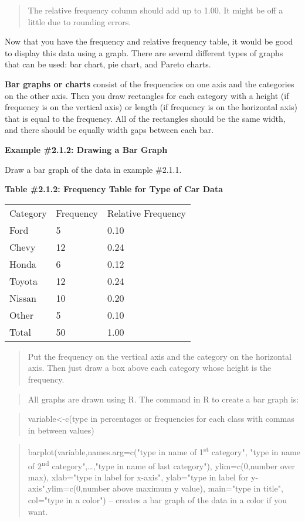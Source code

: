 \documentclass[]{book}
\begin{document}
\begin{quote}
The relative frequency column should add up to 1.00. It might be off a little due to rounding errors.
\end{quote}

Now that you have the frequency and relative frequency table, it would be good to display this data using a graph. There are several different types of graphs that can be used: bar chart, pie chart, and Pareto charts.

\textbf{Bar graphs or charts} consist of the frequencies on one axis and the categories on the other axis. Then you draw rectangles for each category with a height (if frequency is on the vertical axis) or length (if frequency is on the horizontal axis) that is equal to the frequency. All of the rectangles should be the same width, and there should be equally width gaps between each bar.

\textbf{Example \#2.1.2: Drawing a Bar Graph}

Draw a bar graph of the data in example \#2.1.1.

\textbf{Table \#2.1.2: Frequency Table for Type of Car Data}

\begin{longtable}[]{@{}lll@{}}
\toprule
\endhead
Category & Frequency & Relative Frequency\tabularnewline
Ford & 5 & 0.10\tabularnewline
Chevy & 12 & 0.24\tabularnewline
Honda & 6 & 0.12\tabularnewline
Toyota & 12 & 0.24\tabularnewline
Nissan & 10 & 0.20\tabularnewline
Other & 5 & 0.10\tabularnewline
Total & 50 & 1.00\tabularnewline
\bottomrule
\end{longtable}

\begin{quote}
Put the frequency on the vertical axis and the category on the horizontal axis. Then just draw a box above each category whose height is the frequency.
\end{quote}

\begin{quote}
All graphs are drawn using R. The command in R to create a bar graph is:
\end{quote}

\begin{quote}
variable\textless{}-c(type in percentages or frequencies for each class with commas in between values)
\end{quote}

\begin{quote}
barplot(variable,names.arg=c("type in name of 1\textsuperscript{st} category", "type in name of 2\textsuperscript{nd} category",\ldots{},"type in name of last category"), ylim=c(0,number over max), xlab="type in label for x-axis", ylab="type in label for y-axis",ylim=c(0,number above maximum y value), main="type in title", col="type in a color") -- creates a bar graph of the data in a color if you want.
\end{quote}
\end{document}
